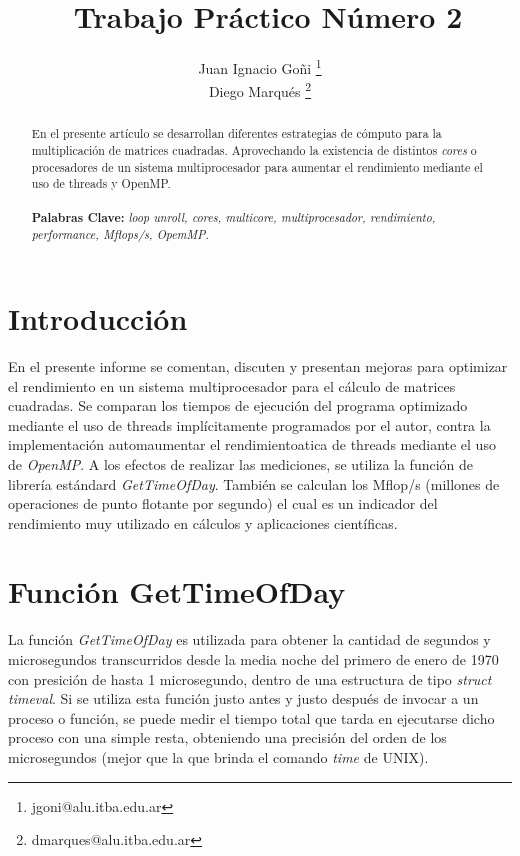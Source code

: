 \documentclass[a4paper,11pt]{article}
\begin{document}
\title{{\ Trabajo Pr\'actico N\'umero 2}}
\author{Juan Ignacio Go\~ni \footnote{jgoni@alu.itba.edu.ar} \\ Diego Marqu\'es \footnote{dmarques@alu.itba.edu.ar}}



\maketitle
\begin{abstract}
En el presente art\'iculo se desarrollan diferentes estrategias de c\'omputo para la multiplicaci\'on de matrices cuadradas. Aprovechando la existencia de distintos \emph{cores} o procesadores de un sistema multiprocesador para aumentar el rendimiento mediante el uso de threads y OpenMP.
\\ \\
\textbf{Palabras Clave: }\emph{loop unroll, cores, multicore, multiprocesador, rendimiento, performance, Mflops/s, OpemMP.}
\end{abstract}



\section{Introducci\'on}

En el presente informe se comentan, discuten y presentan mejoras para optimizar el rendimiento en un sistema multiprocesador para el c\'alculo de matrices cuadradas. Se comparan los tiempos de ejecuci\'on del programa optimizado mediante el uso de threads impl\'icitamente programados por el autor, contra la implementaci\'on automaumentar el rendimientoatica de threads mediante el uso de \emph{OpenMP}.
A los efectos de realizar las mediciones, se utiliza la funci\'on de librer\'ia est\'andard \emph{GetTimeOfDay}.
Tambi\'en se calculan los Mflop/s (millones de operaciones de punto flotante por segundo) el cual es un indicador del rendimiento muy utilizado en c\'alculos y aplicaciones cient\'ificas.

\section{Funci\'on GetTimeOfDay}

La funci\'on \emph{GetTimeOfDay} es utilizada para obtener la cantidad de segundos y microsegundos transcurridos desde la media noche del primero de enero de
1970 con presici\'on de hasta 1 microsegundo, dentro de una estructura de tipo \emph{struct timeval}. Si se utiliza esta funci\'on justo antes y justo despu\'es de invocar
a un proceso o funci\'on, se puede medir el tiempo total que tarda en ejecutarse dicho proceso con una simple resta, obteniendo una precisi\'on del orden de los
microsegundos (mejor que la que brinda el comando \emph{time} de UNIX).
\end{document}
